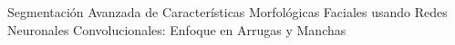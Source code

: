\begin{center}
	\vspace*{10cm}
	{Segmentación Avanzada de Características Morfológicas Faciales usando Redes Neuronales Convolucionales: Enfoque en Arrugas y Manchas}
\end{center}
